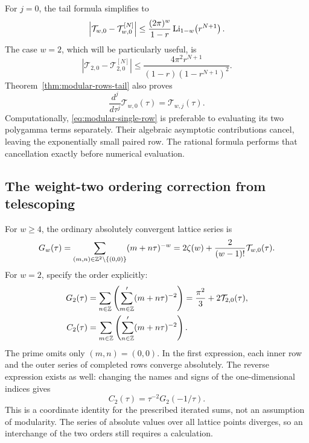 For \(j=0\), the tail formula simplifies to
\[
\left|\mathcal T_{w,0}-\mathcal T_{w,0}^{[N]}\right|
\le\frac{(2\pi)^w}{1-r}\operatorname{Li}_{1-w}\!\left(r^{N+1}\right).
\]
The case \(w=2\), which will be particularly useful, is
\begin{equation}
\left|\mathcal T_{2,0}-\mathcal T_{2,0}^{[N]}\right|
\le\frac{4\pi^2r^{N+1}}
 {(1-r)(1-r^{N+1})^2}.
\label{eq:modular-weight-two-tail}
\end{equation}
Theorem~\ref{thm:modular-rows-tail} also proves
\begin{equation}
\frac{d^j}{d\tau^j}\mathcal T_{w,0}(\tau)
=\mathcal T_{w,j}(\tau).
\label{eq:modular-termwise-derivatives}
\end{equation}
Computationally, \eqref{eq:modular-single-row} is preferable to
evaluating its two polygamma terms separately. Their algebraic
asymptotic contributions cancel, leaving the exponentially small
paired row. The rational formula performs that cancellation exactly
before numerical evaluation.

\subsection{The weight-two ordering correction from telescoping}

For \(w\ge4\), the ordinary absolutely convergent lattice series is
\[
G_w(\tau)=\sum_{(m,n)\in\mathbb{Z}^2\setminus\{(0,0)\}}
                  (m+n\tau)^{-w}
=2\zeta(w)+\frac{2}{(w-1)!}\mathcal T_{w,0}(\tau).
\]
For \(w=2\), specify the order explicitly:
\begin{align}
G_2(\tau)&=\sum_{n\in\mathbb{Z}}
        \left(\sum_{m\in\mathbb{Z}}'(m+n\tau)^{-2}\right)
 =\frac{\pi^2}{3}+2\mathcal T_{2,0}(\tau),
\label{eq:modular-G2-definition}\\
C_2(\tau)&=\sum_{m\in\mathbb{Z}}
        \left(\sum_{n\in\mathbb{Z}}'(m+n\tau)^{-2}\right).
\label{eq:modular-C2-definition}
\end{align}
The prime omits only \((m,n)=(0,0)\). In the first expression, each
inner row and the outer series of completed rows converge absolutely.
The reverse expression exists as well: changing the names and signs
of the one-dimensional indices gives
\begin{equation}
C_2(\tau)=\tau^{-2}G_2(-1/\tau).
\label{eq:modular-C2-coordinate}
\end{equation}
This is a coordinate identity for the prescribed iterated sums, not
an assumption of modularity. The series of absolute values over all
lattice points diverges, so an interchange of the two orders still
requires a calculation.

